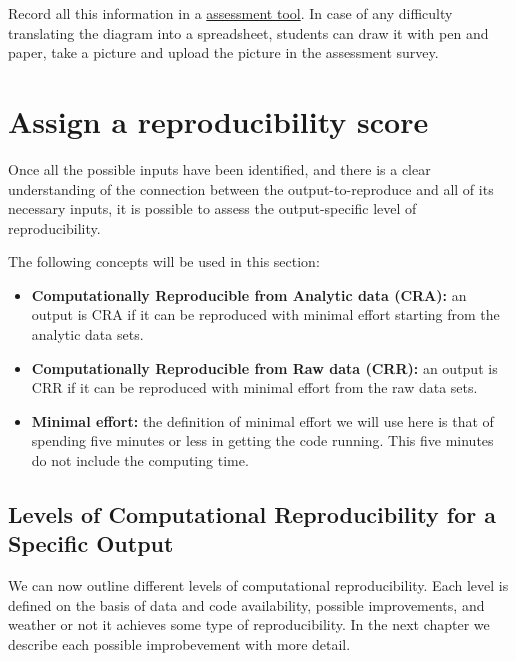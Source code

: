 \documentclass[]{book}
\begin{document}
Record all this information in a \href{https://docs.google.com/spreadsheets/d/1LUIdVFH0OfR70C7z07TYeE-uWzKI_JIeWUMaYhqEKK0/edit\#gid=1384504774\&range=A1}{assessment tool}.
In case of any difficulty translating the diagram into a spreadsheet, students can
draw it with pen and paper, take a picture and upload the picture in the assessment survey.

\hypertarget{assign-a-reproducibility-score}{%
\section{Assign a reproducibility score}\label{assign-a-reproducibility-score}}

Once all the possible inputs have been identified, and there is a clear understanding of the connection between the output-to-reproduce and all of its necessary inputs, it is possible to assess the output-specific level of reproducibility.

The following concepts will be used in this section:

\begin{itemize}
\item
  \textbf{Computationally Reproducible from Analytic data (CRA):} an output is CRA if it can be reproduced with minimal effort starting from the analytic data sets.
\item
  \textbf{Computationally Reproducible from Raw data (CRR):} an output is CRR if it can be reproduced with minimal effort from the raw data sets.
\item
  \textbf{Minimal effort:} the definition of minimal effort we will use here is that of spending
  five minutes or less in getting the code running. This five minutes do not include the computing time.
\end{itemize}

\hypertarget{levels-of-computational-reproducibility-for-a-specific-output}{%
\subsection{Levels of Computational Reproducibility for a Specific Output}\label{levels-of-computational-reproducibility-for-a-specific-output}}

We can now outline different levels of computational reproducibility. Each level is defined on the basis of data and code availability, possible improvements, and weather or not it achieves some type of reproducibility. In the next chapter we describe each possible improbevement with more detail.
\end{document}
